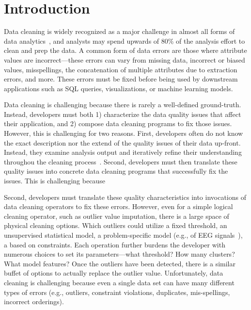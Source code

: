 \section{Introduction}\label{intro}\sloppy


Data cleaning is widely recognized as a major challenge in almost all forms of data analytics~\cite{nytimes}, and analysts may spend upwards of 80\% of the analysis effort to clean and prep the data.  A common form of data errors are those where attribute values are incorrect---these errors can vary from missing data, incorrect or biased values, misspellings, the concatenation of multiple attributes due to extraction errors, and more.  These errors must be fixed before being used by downstream applications such as SQL queries, visualizations, or machine learning models.    


Data cleaning is challenging because there is rarely a well-defined ground-truth. Instead, developers must both 1) characterize the data quality issues that affect their application, and 2) compose data cleaning programs to fix those issues.  However, this is challenging for two reasons.  First, developers often do not know the exact description nor the extend of the quality issues of their data up-front.  Instead, they examine analysis output and iteratively refine their understanding throughou the cleaning process~\cite{krishnan2016hilda}.  Second, developers must then translate these quality issues into concrete data cleaning programs that successfully fix the issues.  This is challenging because 

Second, developers must translate these quality characteristics into invocations of data cleaning operators to fix these errors.  However, even for a simple logical cleaning operator, such as outlier value imputation, there is a large space of physical cleaning options.  Which  outliers could utilize a fixed threshold, an unsupervised statistical model, a problem-specific model (e.g., of EEG signals~\cite{}), a based on constraints.  Each operation further burdens the developer with numerous choices to set its parameters---what threshold?  How many clusters? What model features?   Once the outliers have been detected, there is a similar buffet of options to actually replace the outlier value.     Unfortunately, data cleaning is challenging because even a single data set can have many different types of errors (e.g., outliers, constraint violations, duplicates, mis-spellings, incorrect orderings).




